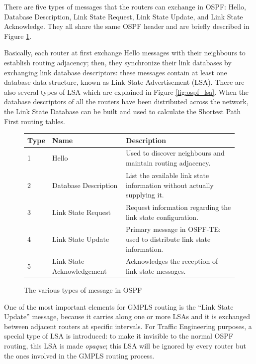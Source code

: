 \documentclass[10pt,a4paper]{report}
\begin{document}
There are five types of messages that the routers can exchange in
OSPF: Hello, Database Description, Link State Request, Link State
Update, and Link State Acknowledge. They all share the same OSPF
header and are briefly described in Figure \ref{fig:ospf_messages}.

Basically, each router at first exchange Hello messages with their
neighbours to establish routing adjacency; then, they synchronize
their link databases by exchanging link database descriptors: these
messages contain at least one database data structure, known as Link
State Advertisement (LSA). There are also several types of LSA which
are explained in Figure \ref{fig:ospf_lsa}. When the database
descriptors of all the routers have been distributed across the
network, the Link State Database can be built and used to calculate
the Shortest Path First routing tables.

\begin{figure}[!tbp]
  \begin{center}
    \begin{tabular}{|l|l|p{}|}
      \hline
      Type & Name & Description \\ \hline
      1 & Hello & Used to discover neighbours and maintain routing
      adjacency. \\
      2 & Database Description & List the available link state
      information without actually supplying it. \\
      3 & Link State Request & Request information regarding the link
      state configuration. \\
      4 & Link State Update & Primary message in OSPF-TE: used to
      distribute link state information. \\
      5 & Link State Acknowledgement & Acknowledges the reception of
      link state messages. \\
      \hline
    \end{tabular}
    \caption[OSPF Messages]{The various types of message in OSPF}
    \label{fig:ospf_messages}
  \end{center}
\end{figure}

One of the most important elements for GMPLS routing is the ``Link
State Update'' message, because it carries along one or more LSAs and
it is exchanged between adjacent routers at specific intervals. For
Traffic Engineering purposes, a special type of LSA is introduced: to
make it invisible to the normal OSPF routing, this LSA is made
\textit{opaque}; this LSA will be ignored by every router but the ones
involved in the GMPLS routing process. 
\end{document}
